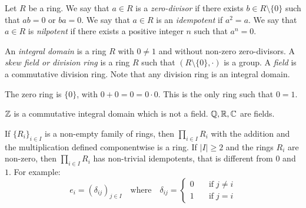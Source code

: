 Let $R$ be a ring. We say that $a\in R$ is a {\em zero-divisor} if there exists $b\in R\setminus\{0\}$ such that $ab=0$ or $ba=0$. We say that $a\in R$ is an {\em idempotent} if $a^2=a$. We say that $a\in R$ is {\em nilpotent} if there exists a positive integer $n$ such that $a^n=0$.  

An {\em integral domain} is a ring $R$ with $0\neq 1$ and without non-zero zero-divisors.
A {\em skew field or division ring} is a ring $R$ such that $(R\setminus \{0\},\cdot)$ is a group. 
A {\em field} is a commutative division ring. Note that any division ring is an integral domain.

\begin{example} The zero ring is $\{0\}$, with $0+0=0=0\cdot 0$. This is the only ring such that $0=1$.
\end{example}

\begin{example}
 $\mathbb{Z}$ is a commutative integral domain which is not a field.
 $\mathbb{Q},\mathbb{R},\mathbb{C}$ are fields.
 \end{example}


%


\begin{example}
If $\{ R_i\} _{i\in I}$ is a non-empty family of rings, then
$\prod_{i\in I}R_i$ with the addition and the multiplication defined componentwise is a ring. If $|I|\geq 2$ and the rings $R_i$ are non-zero, then $\prod_{i\in I}R_i$ has non-trivial idempotents, that is different from $0$ and $1$. For example:
$$e_i=(\delta _{ij})_{j\in I}\quad\mbox{where}\quad\delta_{ij}=\left\{\begin{array}{ll}
0&\quad\mbox{if}\; j\neq i\\
1&\quad\mbox{if}\; j=i\end{array}\right. $$
\end{example}

